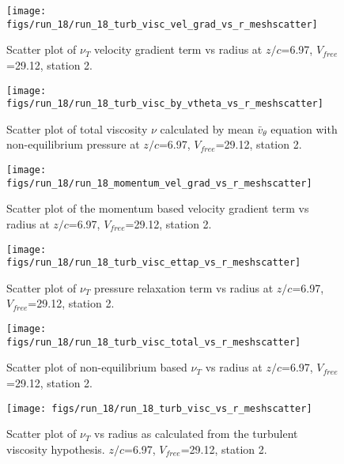 \begin{figure}[H]
\centering
\texttt{[image: figs/run\_18/run\_18\_turb\_visc\_vel\_grad\_vs\_r\_meshscatter]}
\caption{Scatter plot of $\nu_T$ velocity gradient term vs radius at $z/c$=6.97, $V_{free}$=29.12, station 2.}
\end{figure}


\begin{figure}[H]
\centering
\texttt{[image: figs/run\_18/run\_18\_turb\_visc\_by\_vtheta\_vs\_r\_meshscatter]}
\caption{Scatter plot of total viscosity $\nu$ calculated by mean $\bar{v}_{\theta}$ equation with non-equilibrium pressure at $z/c$=6.97, $V_{free}$=29.12, station 2.}
\end{figure}


\begin{figure}[H]
\centering
\texttt{[image: figs/run\_18/run\_18\_momentum\_vel\_grad\_vs\_r\_meshscatter]}
\caption{Scatter plot of the momentum based velocity gradient term vs radius at $z/c$=6.97, $V_{free}$=29.12, station 2.}
\end{figure}


\begin{figure}[H]
\centering
\texttt{[image: figs/run\_18/run\_18\_turb\_visc\_ettap\_vs\_r\_meshscatter]}
\caption{Scatter plot of $\nu_T$ pressure relaxation term vs radius at $z/c$=6.97, $V_{free}$=29.12, station 2.}
\end{figure}


\begin{figure}[H]
\centering
\texttt{[image: figs/run\_18/run\_18\_turb\_visc\_total\_vs\_r\_meshscatter]}
\caption{Scatter plot of non-equilibrium based $\nu_T$ vs radius at $z/c$=6.97, $V_{free}$=29.12, station 2.}
\end{figure}


\begin{figure}[H]
\centering
\texttt{[image: figs/run\_18/run\_18\_turb\_visc\_vs\_r\_meshscatter]}
\caption{Scatter plot of $\nu_T$ vs radius as calculated from the turbulent viscosity hypothesis. $z/c$=6.97, $V_{free}$=29.12, station 2.}
\end{figure}


